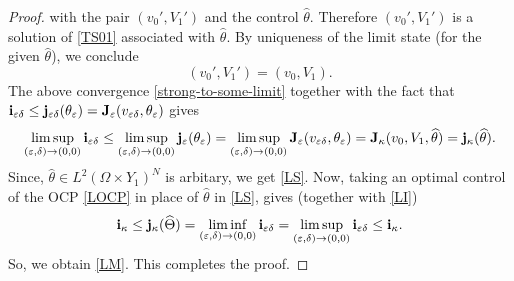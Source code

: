 \documentclass[11pt,a4paper]{article}
\numberwithin{equation}{section}
\def\O{\Omega}
\def\d{\delta}
\def\e{\varepsilon}
\def\Te{{\cal T}_\varepsilon}
\def\ed{{\varepsilon\delta}}
\def\wh{\widehat }
\def\X{\times }
\def\Gi{{\bf i}}
\def\Gj{{\bf j}}
\def\GJ{{\bf J}}
\newtheorem{proposition}{Proposition}
\begin{document}
\begin{proof}
		with the pair $(v_0',V_1')$ and the control $\widehat\theta$. Therefore $(v_0',V_1')$ is a solution of \eqref{TS01}
		associated with $\widehat\theta$. By uniqueness of the limit state (for the given $\widehat\theta$),
		we conclude
		\[
		(v_0',V_1')=(v_0,V_1).
		\]
		The above convergence \eqref{strong-to-some-limit} together with the fact that $\Gi_\ed\leq \Gj_\ed(\theta_\e)=\GJ_\e(v_\ed,\theta_\e)$ gives
		$$\limsup_{(\e,\d)\to(0,0)}\Gi_\ed\leq \limsup_{(\e,\d)\to(0,0)}\Gj_\e(\theta_\e)=\limsup_{(\e,\d)\to(0,0)}\GJ_\e(v_\ed,\theta_\e)=\GJ_\kappa(v_0,V_1,\wh\theta)=\Gj_\kappa(\wh \theta).$$
		Since, $\wh \theta\in L^2(\O\X Y_1)^N$ is arbitary, we get \eqref{LS}. Now, taking an optimal control of the OCP \eqref{LOCP} in place of $\wh \theta$ in \eqref{LS}, gives (together with \eqref{LI})
		$$\Gi_\kappa\leq \Gj_\kappa(\wh\Theta)=\liminf_{(\e,\d)\to(0,0)}\Gi_\ed=\limsup_{(\e,\d)\to(0,0)}\Gi_\ed\leq \Gi_\kappa.$$
		So, we obtain \eqref{LM}. This completes the proof.
	\end{proof}
\end{document}
